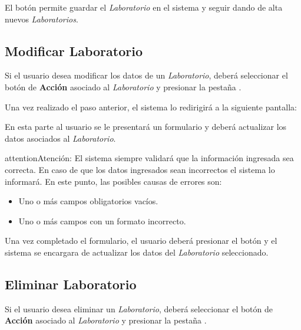 \documentclass[a4paper,10pt,spanish]{sphinxmanual}
\begin{document}
El botón  permite guardar el \emph{Laboratorio} en el sistema y seguir dando de alta nuevos \emph{Laboratorios}.


\subsection{Modificar Laboratorio}
\label{laboratorios:id2}\label{laboratorios:modificar-laboratorio}
Si el usuario desea modificar los datos de un \emph{Laboratorio}, deberá seleccionar el botón de \textbf{Acción} asociado al \emph{Laboratorio} y presionar la pestaña .


Una vez realizado el paso anterior, el sistema lo redirigirá a la siguiente pantalla:


En esta parte al usuario se le presentará un formulario y deberá actualizar los datos asociados al \emph{Laboratorio}.

\begin{notice}{attention}{Atención:}
El sistema siempre validará que la información ingresada sea correcta. En caso de que los datos ingresados sean incorrectos el sistema lo informará.
En este punto, las posibles causas de errores son:
\begin{itemize}
\item {} 
Uno o más campos obligatorios vacíos.

\item {} 
Uno o más campos con un formato incorrecto.

\end{itemize}
\end{notice}

Una vez completado el formulario, el usuario deberá presionar el botón  y el sistema se encargara de actualizar los datos del \emph{Laboratorio} seleccionado.


\subsection{Eliminar Laboratorio}
\label{laboratorios:eliminar-laboratorio}\label{laboratorios:id3}
Si el usuario desea eliminar un \emph{Laboratorio}, deberá seleccionar el botón de \textbf{Acción} asociado al \emph{Laboratorio} y presionar la pestaña .
\end{document}
